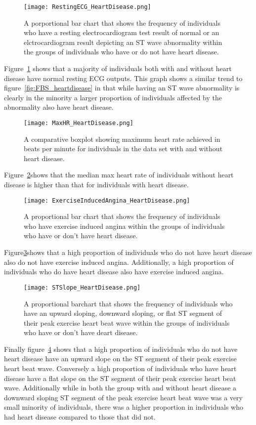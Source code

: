 \documentclass[12pt]{article}
\begin{document}
\begin{figure}[tbp]
  \centering
  \texttt{[image: RestingECG\_HeartDisease.png]}
  \caption{A porportional bar chart that shows the frequency of individuals who have a resting electrocardiogram test result of normal or an elctrocardiogram result depicting an ST wave abnormality within the groups of individuals who have or do not have heart disease.}
  \label{fig:ECG_heartdisease}
\end{figure}
Figure~\ref*{fig:ECG_heartdisease} shows that a majority of individuals both with and without heart disease have normal resting ECG outputs. This graph shows a similar trend to figure~\ref*{fig:FBS_heartdisease} in that while having an ST wave abnormality is clearly in the minority a larger proportion of individuals affected by the abnormality also have heart disease.
\begin{figure}[tbp]
  \centering
  \texttt{[image: MaxHR\_HeartDisease.png]}
  \caption{A comparative boxplot showing maximum heart rate achieved in beats per minute for individuals in the data set with and without heart disease.}
  \label{fig:maxHR_heartdisease}
\end{figure}
Figure~\ref*{fig:maxHR_heartdisease}shows that the median max heart rate of individuals without heart disease is higher than that for individuals with heart disease. 
\begin{figure}[tbp]
  \centering
  \texttt{[image: ExerciseInducedAngina\_HeartDisease.png]}
  \caption{A proportional bar chart that shows the frequency of individuals who have exercise induced angina within the groups of individuals who have or don't have heart disease.}
  \label{fig:EIA_heartdisease}
\end{figure}
Figure\ref*{fig:EIA_heartdisease}shows that a high proportion of individuals who do not have heart disease also do not have exercise induced angina. Additionally, a high proportion of individuals who do have heart disease also have exercise induced angina. 
\begin{figure}[tbp]
  \centering
  \texttt{[image: STSlope\_HeartDisease.png]}
  \caption{A proportional barchart that shows the frequency of individuals who have an upward sloping, downward sloping, or flat ST segment of their peak exercise heart beat wave within the groups of individuals who have or don't have deart disease.}
  \label{fig:STslope_heartdisease}
\end{figure}
Finally figure~\ref*{fig:STslope_heartdisease} shows that a high proportion of individuals who do not have heart disease have an upward slope on the ST segment of their peak exercise heart beat wave. Conversely a high proportion of individuals who have heart disease have a flat slope on the ST segment of their peak exercise heart beat wave. Additionally while in both the group with and without heart disease a downward sloping ST segment of the peak exercise heart beat wave was a very small minority of individuals, there was a higher proportion in individuals who had heart disease compared to those that did not. \par 
\end{document}

